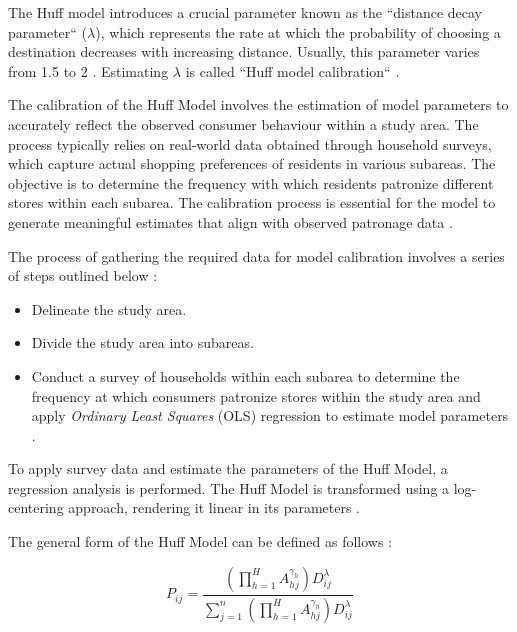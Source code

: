 The Huff model introduces a crucial parameter known as the ``distance decay parameter`` ($\lambda$), which represents the rate at which the probability of choosing a destination decreases with increasing distance. Usually, this parameter varies from 1.5 to 2 \cite{huff2008calibrating}. Estimating $\lambda$ is called ``Huff model calibration`` \cite{huff1964defining}. 

The calibration of the Huff Model involves the estimation of model parameters to accurately reflect the observed consumer behaviour within a study area. The process typically relies on real-world data obtained through household surveys, which capture actual shopping preferences of residents in various subareas. The objective is to determine the frequency with which residents patronize different stores within each subarea. The calibration process is essential for the model to generate meaningful estimates that align with observed patronage data \cite{huff2008calibrating}.

The process of gathering the required data for model calibration involves a series of steps outlined below \cite{huff2008calibrating}:

\begin{itemize}
    \item Delineate the study area.
    \item Divide the study area into subareas.
    \item Conduct a survey of households within each subarea to determine the frequency at which consumers patronize stores within the study area and apply \textit{Ordinary Least Squares} (OLS) regression to estimate model parameters \cite{huff2008calibrating}.
\end{itemize}

To apply survey data and estimate the parameters of the Huff Model, a regression analysis is performed. The Huff Model is transformed using a log-centering approach, rendering it linear in its parameters \cite{huff2008calibrating}. 

The general form of the Huff Model can be defined as follows \cite{huff2008calibrating}:

\begin{equation}
P_{ij}=\frac{( \prod_{h=1}^{H} A_{hj}^{\gamma_h} ) D_{ij}^\lambda}{\sum_{j=1}^{n} ( \prod_{h=1}^H A_{hj}^{\gamma_h} ) D_{ij}^\lambda}
\label{eq:huff-general}
\end{equation}

